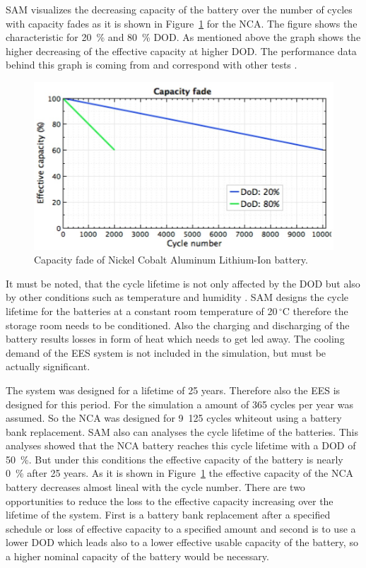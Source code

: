 SAM visualizes the decreasing capacity of the battery over the number of cycles with capacity fades as it is shown in Figure~\ref{CapacityFade} for the NCA. The figure shows the characteristic for 20~\% and 80~\% DOD. As mentioned above the graph shows the higher decreasing of the effective capacity at higher DOD. The performance data behind this graph is coming from \cite{Dahn2011} and correspond with other tests \cite{Read2009}.
\begin{figure}[bhtp]  
\centering
\includegraphics[width=0.75\linewidth]{FIG/CapacityFade}
\caption[Capacity fade of Nickel Cobalt Aluminum Lithium-Ion battery.]{Capacity fade of Nickel Cobalt Aluminum Lithium-Ion battery.}\label{CapacityFade}
\end{figure}

It must be noted, that the cycle lifetime is not only affected by the DOD but also by other conditions such as temperature and humidity \cite{MitElectricVehilceTeam2008}. SAM designs the cycle lifetime for the batteries at a constant room temperature of 20$\,^{\circ}\mathrm{C}$ therefore the storage room needs to be conditioned. Also the charging and discharging of the battery results losses in form of heat which needs to get led away. The cooling demand of the EES system is not included in the simulation, but must be actually significant. \cite{Diorio2015} 



The system was designed for a lifetime of 25 years. Therefore also the EES is designed for this period. For the simulation a amount of 365 cycles per year was assumed. So the NCA was designed for 9~125 cycles whiteout using a battery bank replacement. SAM also can analyses the cycle lifetime of the batteries. This analyses showed that the NCA battery reaches this cycle lifetime with a DOD of 50~\%. But under this conditions the effective capacity of the battery is nearly 0~\% after 25 years. As it is shown in Figure~\ref{CapacityFade} the effective capacity of the NCA battery decreases almost lineal with the cycle number. There are two opportunities to reduce the loss to the effective capacity increasing over the lifetime of the system. First is a battery bank replacement after a specified schedule or loss of effective capacity to a specified amount and second is to use a lower DOD which leads also to a lower effective usable capacity of the battery, so a higher nominal capacity of the battery would be necessary.



